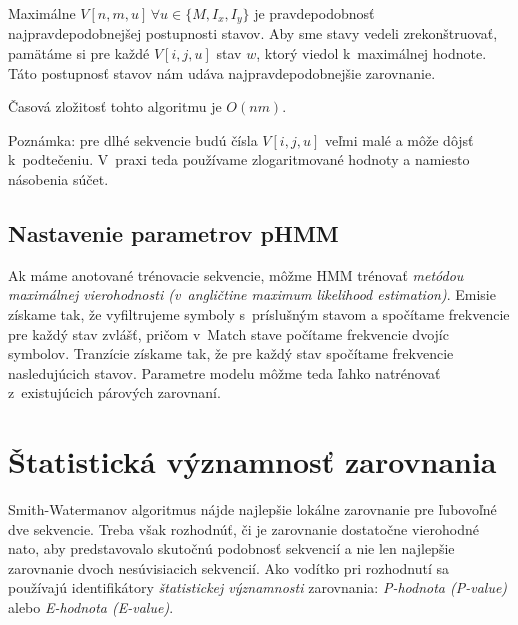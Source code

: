 Maximálne $V[n, m, u]\, \forall u \in \{M, I_x, I_y\}$ je pravdepodobnosť najpravdepodobnejšej postupnosti stavov.
Aby sme stavy vedeli zrekonštruovať, pamätáme si pre každé $V[i, j, u]$ stav $w$, ktorý viedol k~maximálnej hodnote. Táto postupnosť stavov nám udáva najpravdepodobnejšie zarovnanie.

Časová zložitosť tohto algoritmu je $O(nm)$.

Poznámka: pre dlhé sekvencie budú čísla $V[i, j, u]$ veľmi malé a môže dôjsť k~podtečeniu. V~praxi teda používame zlogaritmované hodnoty a namiesto násobenia súčet.
\cite{durbin}

\subsection{Nastavenie parametrov pHMM}
\label{subsec:hmmtraining}
Ak máme anotované trénovacie sekvencie, môžme HMM trénovať \textit{metódou maximálnej vierohodnosti (v~angličtine maximum likelihood estimation)}. \cite{ durbin, wiki:mle}
Emisie získame tak, že vyfiltrujeme symboly s~príslušným stavom a spočítame frekvencie pre každý stav zvlášť, pričom v~Match stave počítame frekvencie dvojíc symbolov. Tranzície získame tak, že pre každý stav spočítame frekvencie nasledujúcich stavov. Parametre modelu môžme teda ľahko natrénovať z~existujúcich párových zarovnaní.

\section[Štat. významnosť ]{Štatistická významnosť zarovnania}
Smith-Watermanov algoritmus nájde najlepšie lokálne zarovnanie pre ľubovoľné dve sekvencie. Treba však rozhodnúť, či je zarovnanie dostatočne vierohodné nato, aby predstavovalo skutočnú podobnosť sekvencií a nie len najlepšie zarovnanie dvoch nesúvisiacich sekvencií.
Ako vodítko pri rozhodnutí sa používajú identifikátory \textit{štatistickej významnosti} zarovnania: \textit{P-hodnota (P-value)} alebo \textit{E-hodnota (E-value)}.

